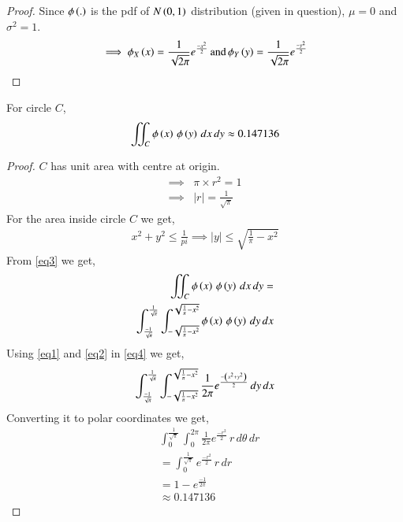 \documentclass[journal,12pt,twocolumn]{IEEEtran}
\begin{document}
\begin{proof}
Since $\phi\left(.\right)$ is the pdf of $N\left(0,1\right)$ distribution (given in question),
$\mu = 0$ and $\sigma^2 = 1$.
\begin{align*}
    \implies \phi_X\left(x\right) = \frac{1}{\sqrt{2\pi}}e^\frac{-x^2}{2}\,\text{and}\,
    \phi_Y\left(y\right) = \frac{1}{\sqrt{2\pi}}e^\frac{-y^2}{2}
\end{align*}
\end{proof}

\begin{lemma}
For circle $C$,
\begin{align}
    \iint_C{\phi\left(x\right)\,\phi\left(y\right)\,dx\,dy}  \approx 0.147136 \label{eq9}
\end{align}
\end{lemma}

\begin{proof}
$C$ has unit area with centre at origin.
\begin{align}
    \implies &\pi\times r^2=1\\
    \implies &|r| = \frac{1}{\sqrt{\pi}}
\end{align}
For the area inside circle $C$ we get,
\begin{align}
    x^2+y^2\leq \frac{1}{pi}
    \implies |y| \leq \sqrt{\frac{1}{\pi}-x^2}\label{eq3}
\end{align}
From \eqref{eq3} we get,
\begin{align}
    \iint_C{\phi\left(x\right)\,\phi\left(y\right)\,dx\,dy} = \nonumber\\
    \int_{\frac{-1}{\sqrt{\pi}}}^{\frac{1}{\sqrt{\pi}}} \int_{-\sqrt{\frac{1}{\pi}-x^2}}^{\sqrt{\frac{1}{\pi}-x^2}} \phi\left(x\right)\,\phi\left(y\right)\,dy\,dx \label{eq4}
\end{align}
Using \eqref{eq1} and \eqref{eq2} in \eqref{eq4} we get,
\begin{align}
    \int_{\frac{-1}{\sqrt{\pi}}}^{\frac{1}{\sqrt{\pi}}} \int_{-\sqrt{\frac{1}{\pi}-x^2}}^{\sqrt{\frac{1}{\pi}-x^2}} \frac{1}{2\pi}e^\frac{-\left(x^2+y^2\right)}{2}\,dy\,dx
\end{align}
Converting it to polar coordinates we get,
\begin{align}
    &\int_{0}^{\frac{1}{\sqrt{\pi}}} \int_{0}^{2\pi} \frac{1}{2\pi}e^\frac{-r^2}{2}\,r\,d\theta\,dr\\
    &= \int_{0}^{\frac{1}{\sqrt{\pi}}}e^\frac{-r^2}{2}\,r\,dr\\
    &= 1 - e^{\frac{-1}{2\pi}}\\
    &\approx 0.147136
\end{align}
\end{proof}
\end{document}
